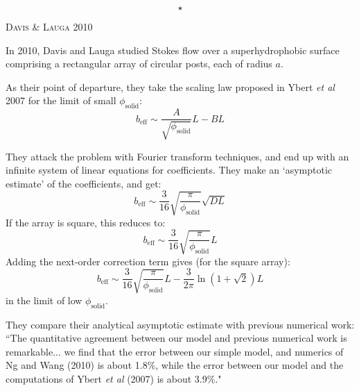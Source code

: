\documentclass[a4paper]{report}
\newcommand{\beff}{\ensuremath{b_{\mathrm{eff}}}}
\newcommand{\phisol}{\ensuremath{\phi_{\mathrm{solid}}}}
\newcommand{\sep}{\begin{equation*} \star \end{equation*}}
\newcommand{\paper}[1]
         {\colorbox[gray]{0.8}{ \textsc{#1}}
         
         }
\begin{document}
\sep

\paper{Davis \& Lauga 2010}
In 2010, Davis and Lauga \cite{DavisLauga2010} studied Stokes flow over a superhydrophobic surface comprising a rectangular array of circular posts, each of radius $a$.

\begin{center}
\end{center}

As their point of departure, they take the scaling law proposed in Ybert \emph{et al} 2007 for the limit of small $\phisol$:
\begin{equation*}
\beff \sim \frac{A}{\sqrt{\phisol}} L - BL
\end{equation*}

They attack the problem with Fourier transform techniques, and end up with an infinite system of linear equations for coefficients.  They make an `asymptotic estimate' of the coefficients, and get:
\begin{equation*}
\beff \sim \frac{3}{16} \sqrt{ \frac{\pi}{\phisol}} \sqrt{DL}
\end{equation*}
If the array is square, this reduces to:
\begin{equation*}
\beff \sim \frac{3}{16} \sqrt{ \frac{\pi}{\phisol}} L
\end{equation*}
Adding the next-order correction term gives (for the square array):
\begin{equation*}
\beff \sim \frac{3}{16} \sqrt{ \frac{\pi}{\phisol}} L - \frac{3}{2\pi} \ln(1 + \sqrt{2})L
\end{equation*}
in the limit of low $\phisol$.

They compare their analytical asymptotic estimate with previous numerical work: ``The quantitative agreement between our model and previous numerical work is remarkable... we find that the error between our simple model, and numerics of Ng and Wang (2010) \cite{NgWang2010} is about 1.8\%, while the error between our model and the computations of Ybert \emph{et al} (2007) \cite{Ybert2007} is about 3.9\%."
\end{document}
